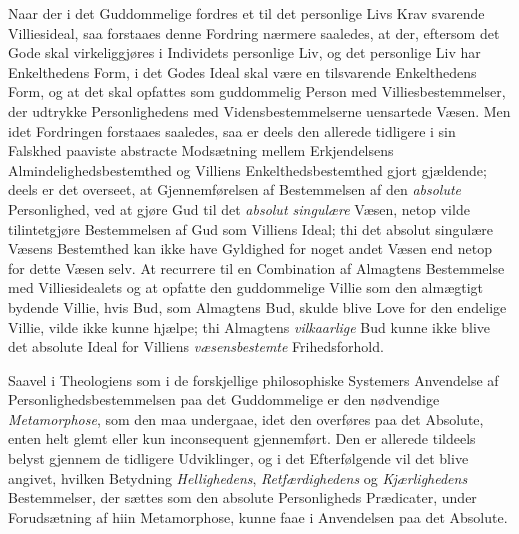 Naar der i det Guddommelige fordres et til det personlige Livs Krav svarende
Villiesideal, saa forstaaes denne Fordring nærmere saaledes, at der, eftersom
det Gode skal virkeliggjøres i Individets personlige Liv, og det personlige
Liv har Enkelthedens Form, i det Godes Ideal skal være en tilsvarende
Enkelthedens Form, og at det skal opfattes som guddommelig Person med
Villiesbestemmelser, der udtrykke Personlighedens med Vidensbestemmelserne
uensartede Væsen. Men idet Fordringen forstaaes saaledes, saa er deels den
allerede tidligere i sin Falskhed paaviste abstracte Modsætning mellem
Erkjendelsens Almindelighedsbestemthed og Villiens Enkelthedsbestemthed gjort
gjældende; deels er det overseet, at Gjennemførelsen af Bestemmelsen af den
\emph{absolute} Personlighed, ved at gjøre Gud til det \emph{absolut
singulære} Væsen, netop vilde tilintetgjøre Bestemmelsen af Gud som Villiens
Ideal; thi det absolut singulære Væsens Bestemthed kan ikke have Gyldighed for
noget andet Væsen end netop for dette Væsen selv. At recurrere til en
Combination af Almagtens Bestemmelse med Villiesidealets og at opfatte den
guddommelige Villie som den almægtigt bydende Villie, hvis Bud, som Almagtens
Bud, skulde blive Love for den endelige Villie, vilde ikke kunne hjælpe; thi
Almagtens \emph{vilkaarlige} Bud kunne ikke blive det absolute Ideal for
Villiens \emph{væsensbestemte} Frihedsforhold.

Saavel i Theologiens som i de forskjellige philosophiske
 Systemers Anvendelse af Personlighedsbestemmelsen paa det Guddommelige er den
nødvendige \emph{Metamorphose}, som den maa undergaae, idet den overføres paa
det Absolute, enten helt glemt eller kun inconsequent gjennemført. Den er
allerede tildeels belyst gjennem de tidligere Udviklinger, og i det
Efterfølgende vil det blive angivet, hvilken Betydning \emph{Hellighedens},
\emph{Retfærdighedens} og \emph{Kjærlighedens} Bestemmelser, der sættes som den
absolute Personligheds Prædicater, under Forudsætning af hiin Metamorphose,
kunne faae i Anvendelsen paa det Absolute.

